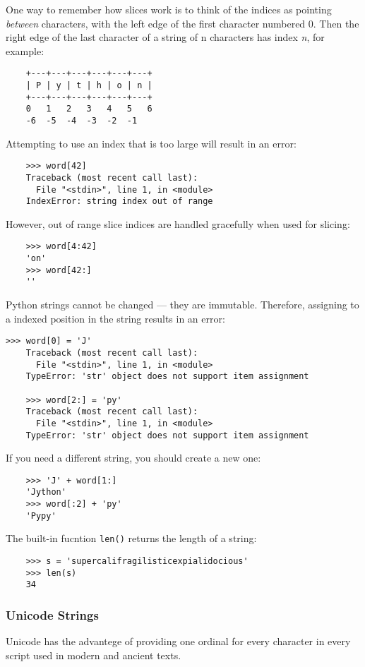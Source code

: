 \documentclass[UTF8]{article}
\begin{document}
One way to remember how slices work is to think of the indices as pointing \emph{between}
characters, with the left edge of the first character numbered 0. Then the right edge of the last
character of a string of n characters has index \emph{n}, for example:
\begin{verbatim}
    +---+---+---+---+---+---+
    | P | y | t | h | o | n |
    +---+---+---+---+---+---+
    0   1   2   3   4   5   6
    -6  -5  -4  -3  -2  -1
\end{verbatim}

Attempting to use an index that is too large will result in an error:
\begin{verbatim}
    >>> word[42]
    Traceback (most recent call last):
      File "<stdin>", line 1, in <module>
    IndexError: string index out of range
\end{verbatim}

However, out of range slice indices are handled gracefully when used for slicing:
\begin{verbatim}
    >>> word[4:42]
    'on'
    >>> word[42:]
    ''
\end{verbatim}

Python strings cannot be changed --- they are immutable. Therefore, assigning to a indexed position
in the string results in an error:
\begin{verbatim}
>>> word[0] = 'J'
    Traceback (most recent call last):
      File "<stdin>", line 1, in <module>
    TypeError: 'str' object does not support item assignment

    >>> word[2:] = 'py'
    Traceback (most recent call last):
      File "<stdin>", line 1, in <module>
    TypeError: 'str' object does not support item assignment
\end{verbatim}

If you need a different string, you should create a new one:
\begin{verbatim}
    >>> 'J' + word[1:]
    'Jython'
    >>> word[:2] + 'py'
    'Pypy'
\end{verbatim}

The built-in fucntion \texttt{len()} returns the length of a string:
\begin{verbatim}
    >>> s = 'supercalifragilisticexpialidocious'
    >>> len(s)
    34
\end{verbatim}

\subsubsection{Unicode Strings}
Unicode has the advantege of providing one ordinal for every character in every script used in
modern and ancient texts.
\end{document}
